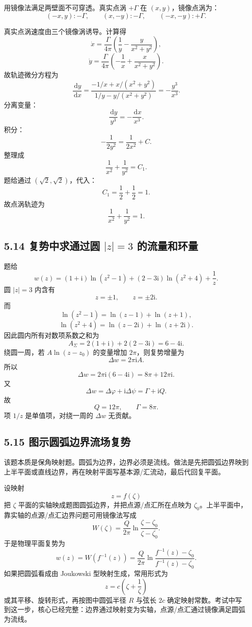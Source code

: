 ﻿\documentclass[UTF8,zihao=-4]{ctexart}
\newcommand{\dd}{\,\mathrm d}
\newcommand{\ii}{\mathrm i}
\begin{document}
用镜像法满足两壁面不可穿透。真实点涡 \(+\Gamma\) 在 \((x,y)\)，镜像点涡为：
\[
(-x,y):-\Gamma,\qquad (x,-y):-\Gamma,\qquad (-x,-y):+\Gamma .
\]

真实点涡速度由三个镜像涡诱导。计算得
\[
\dot x=\frac{\Gamma}{4\pi}\left(\frac1y-\frac{y}{x^2+y^2}\right),
\]
\[
\dot y=\frac{\Gamma}{4\pi}\left(-\frac1x+\frac{x}{x^2+y^2}\right).
\]
故轨迹微分方程为
\[
\frac{\dd y}{\dd x}
=\frac{-1/x+x/(x^2+y^2)}
{1/y-y/(x^2+y^2)}
=-\frac{y^3}{x^3}.
\]
分离变量：
\[
\frac{\dd y}{y^3}=-\frac{\dd x}{x^3}.
\]
积分：
\[
-\frac1{2y^2}=\frac1{2x^2}+C.
\]
整理成
\[
\frac1{x^2}+\frac1{y^2}=C_1.
\]
题给通过 \((\sqrt2,\sqrt2)\)，代入：
\[
C_1=\frac12+\frac12=1.
\]
故点涡轨迹为
\[
\boxed{\frac1{x^2}+\frac1{y^2}=1.}
\]

\subsection*{5.14 复势中求通过圆 \(|z|=3\) 的流量和环量}

题给
\[
w(z)=(1+\ii)\ln(z^2-1)+(2-3\ii)\ln(z^2+4)+\frac1z .
\]
圆 \(|z|=3\) 内含有
\[
z=\pm1,\qquad z=\pm2\ii .
\]
而
\[
\ln(z^2-1)=\ln(z-1)+\ln(z+1),
\]
\[
\ln(z^2+4)=\ln(z-2\ii)+\ln(z+2\ii).
\]
因此圆内所有对数项系数之和为
\[
A_\Sigma=2(1+\ii)+2(2-3\ii)=6-4\ii .
\]
绕圆一周，若 \(A\ln(z-z_0)\) 的变量增加 \(2\pi\)，则复势增量为
\[
\Delta w=2\pi\ii A.
\]
所以
\[
\Delta w=2\pi\ii(6-4\ii)=8\pi+12\pi\ii .
\]
又
\[
\Delta w=\Delta\varphi+\ii\Delta\psi=\Gamma+\ii Q.
\]
故
\[
\boxed{Q=12\pi,\qquad \Gamma=8\pi.}
\]
项 \(1/z\) 是单值项，对绕一周的 \(\Delta w\) 无贡献。

\subsection*{5.15 图示圆弧边界流场复势}

该题本质是保角映射题。圆弧为边界，边界必须是流线。做法是先把圆弧边界映到上半平面或直线边界，再在映射平面写基本源/汇流动，最后代回复平面。

设映射
\[
z=f(\zeta)
\]
把 \(\zeta\) 平面的实轴映成题图圆弧边界，并把点源/点汇所在点映为 \(\zeta_0\)。上半平面中，靠实轴的点源/点汇边界问题可用镜像法写成
\[
W(\zeta)=\frac{Q}{2\pi}
\ln\frac{\zeta-\zeta_0}{\zeta-\overline{\zeta_0}} .
\]
于是物理平面复势为
\[
\boxed{
w(z)=W(f^{-1}(z))
=\frac{Q}{2\pi}
\ln\frac{f^{-1}(z)-\zeta_0}
{f^{-1}(z)-\overline{\zeta_0}}.}
\]
如果把圆弧看成由 Joukowski 型映射生成，常用形式为
\[
z=c\left(\zeta+\frac1\zeta\right)
\]
或其平移、旋转形式，再按图中圆弧半径 \(R\) 与弦长 \(2c\) 确定映射常数。考试中写到这一步，核心已经完整：边界通过映射变为实轴，点源/点汇通过镜像满足圆弧为流线。
\end{document}

